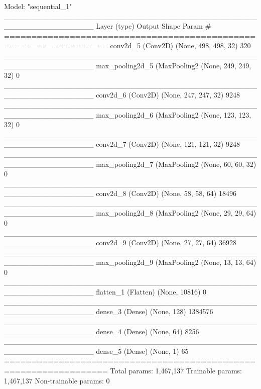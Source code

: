 \newpage

\begin{python}
    Model: "sequential_1"
_________________________________________________________________
Layer (type)                 Output Shape              Param #   
=================================================================
conv2d_5 (Conv2D)            (None, 498, 498, 32)      320       
_________________________________________________________________
max_pooling2d_5 (MaxPooling2 (None, 249, 249, 32)      0         
_________________________________________________________________
conv2d_6 (Conv2D)            (None, 247, 247, 32)      9248      
_________________________________________________________________
max_pooling2d_6 (MaxPooling2 (None, 123, 123, 32)      0         
_________________________________________________________________
conv2d_7 (Conv2D)            (None, 121, 121, 32)      9248      
_________________________________________________________________
max_pooling2d_7 (MaxPooling2 (None, 60, 60, 32)        0         
_________________________________________________________________
conv2d_8 (Conv2D)            (None, 58, 58, 64)        18496     
_________________________________________________________________
max_pooling2d_8 (MaxPooling2 (None, 29, 29, 64)        0         
_________________________________________________________________
conv2d_9 (Conv2D)            (None, 27, 27, 64)        36928     
_________________________________________________________________
max_pooling2d_9 (MaxPooling2 (None, 13, 13, 64)        0         
_________________________________________________________________
flatten_1 (Flatten)          (None, 10816)             0         
_________________________________________________________________
dense_3 (Dense)              (None, 128)               1384576   
_________________________________________________________________
dense_4 (Dense)              (None, 64)                8256      
_________________________________________________________________
dense_5 (Dense)              (None, 1)                 65        
=================================================================
Total params: 1,467,137
Trainable params: 1,467,137
Non-trainable params: 0

\end{python}
\begin{lstlisting}[caption = {Riepilogo del modello. La colonna \lstinline{layer} indica il tipo di strato di cui si tratta. La colonna output mostra la tupla con le dimensioni dello strato in uscita, con una dimensione
    in più \lstinline{None} che è aggiunta per ospitare la batch size. La terza colonna \lstinline{Param \#} indica il numero di pesi all'interno della rete, i quali possono essere distinti in addestrabili, cioè quelli che vengono aggiornati durante la fase di backpropagation, e quelli per cui questo non vale per motivi di regolarizzazione della rete. Il numero totale di parametri si trova \lstinline{(kernel_height*kernel_width*input_filters*output_filters) + 
    output_filters}. Ad esempio nel primo strato si avra 3*3*32*1+32=320.}]
  
\end{lstlisting}

